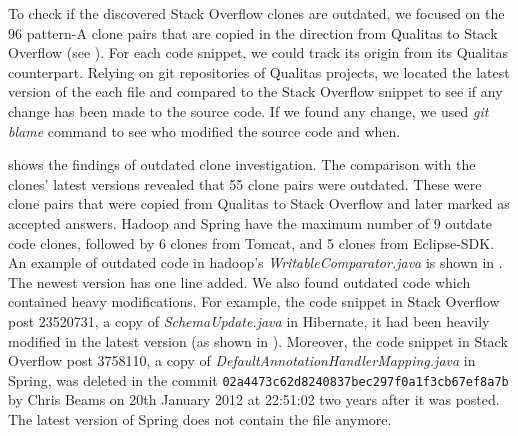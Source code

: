 \documentclass{sig-alternate-05-2015}
\begin{document}
To check if the discovered Stack Overflow clones are outdated, we focused on the 96 pattern-A clone pairs that are copied in the direction from Qualitas to Stack Overflow (see ). For each code snippet, we could track its origin from its Qualitas counterpart. Relying on git repositories of Qualitas projects, we located the latest version of the each file and compared to the Stack Overflow snippet to see if any change has been made to the source code. If we found any change, we used \textit{git blame} command to see who modified the source code and when.


 shows the findings of outdated clone investigation. The comparison with the clones' latest versions revealed that 55 clone pairs were outdated. These were clone pairs that were copied from Qualitas to Stack Overflow and later marked as accepted answers. Hadoop and Spring have the maximum number of 9 outdate code clones, followed by 6 clones from Tomcat, and 5 clones from Eclipse-SDK. An example of outdated code in hadoop's \textit{WritableComparator.java} is shown in . The newest version has one line added. We also found outdated code which contained heavy modifications. For example, the code snippet in Stack Overflow post 23520731, a copy of \textit{SchemaUpdate.java} in Hibernate, it had been heavily modified in the latest version (as shown in ). Moreover, the code snippet in Stack Overflow post 3758110, a copy of \textit{DefaultAnnotationHandlerMapping.java} in Spring, was deleted in the commit \texttt{02a4473c62d8240837bec297f0a1f3cb67ef8a7b} by Chris Beams on 20th January 2012 at 22:51:02 two years after it was posted. The latest version of Spring does not contain the file anymore. 
\end{document}
